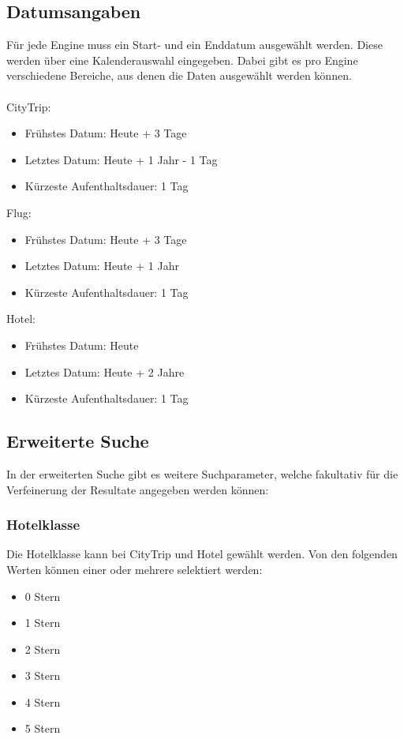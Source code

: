 \subsection{Datumsangaben}
Für jede Engine muss ein Start- und ein Enddatum ausgewählt werden. Diese werden über eine Kalenderauswahl eingegeben. Dabei gibt es pro Engine verschiedene Bereiche, aus denen die Daten ausgewählt werden können.\\
\\  
\noindent CityTrip:
\begin{itemize}
\item Frühstes Datum: Heute + 3 Tage
\item Letztes Datum: Heute + 1 Jahr - 1 Tag
\item Kürzeste Aufenthaltsdauer: 1 Tag
\end{itemize}
\vspace{0 mm}
Flug:
\begin{itemize}
\item Frühstes Datum: Heute + 3 Tage
\item Letztes Datum: Heute + 1 Jahr
\item Kürzeste Aufenthaltsdauer: 1 Tag
\end{itemize}
\vspace{0 mm}
Hotel:
\begin{itemize}
\item Frühstes Datum: Heute
\item Letztes Datum: Heute + 2 Jahre
\item Kürzeste Aufenthaltsdauer: 1 Tag
\end{itemize}

\subsection{Erweiterte Suche}
In der erweiterten Suche gibt es weitere Suchparameter, welche fakultativ für die Verfeinerung der Resultate angegeben werden können:

\subsubsection{Hotelklasse}
Die Hotelklasse kann bei CityTrip und Hotel gewählt werden. Von den folgenden Werten können einer oder mehrere selektiert werden:
\begin{itemize}
\item 0 Stern
\item 1 Stern
\item 2 Stern
\item 3 Stern
\item 4 Stern
\item 5 Stern
\end{itemize}

